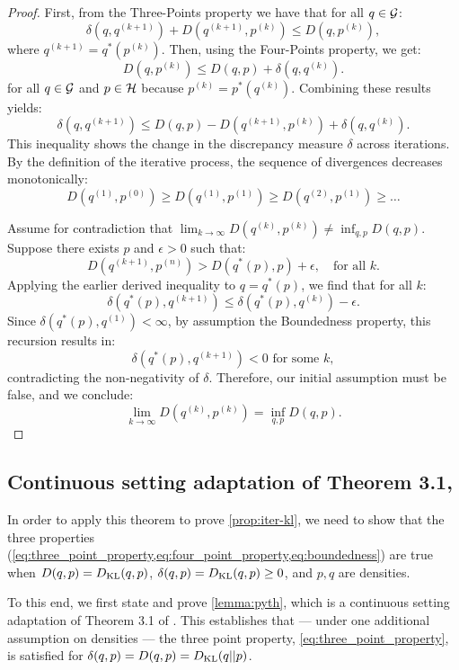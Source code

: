 \begin{proof}
First, from the Three-Points property we have that for all $q \in \mathcal{G}$:
\[
\delta(q, q^{(k+1)}) + D(q^{(k+1)}, p^{(k)}) \leq D(q, p^{(k)}),
\]
where $q^{(k+1)} = q^*(p^{(k)})$. Then, using the Four-Points property, we get:
\[
D(q, p^{(k)}) \leq D(q, p) + \delta(q, q^{(k)}).
\]
for all $q\in\mathcal{G}$ and $p\in\mathcal{H}$ because $p^{(k)} = p^{*}(q^{(k)})$. Combining these results yields:
\[
\delta(q, q^{(k+1)}) \leq D(q, p) - D(q^{(k+1)}, p^{(k)}) + \delta(q, q^{(k)}).
\]
This inequality shows the change in the discrepancy measure $\delta$ across iterations. By the definition of the iterative process, the sequence of divergences decreases monotonically:
\[
D(q^{(1)}, p^{(0)}) \geq D(q^{(1)}, p^{(1)}) \geq D(q^{(2)}, p^{(1)}) \geq \ldots
\]

Assume for contradiction that $\lim_{k \to \infty} D(q^{(k)}, p^{(k)}) \neq \inf_{q, p} D(q, p)$. Suppose there exists $p$ and $\epsilon > 0$ such that:
\[
D(q^{(k+1)}, p^{(n)}) > D(q^*(p), p) + \epsilon, \quad \text{for all } k.
\]
Applying the earlier derived inequality to $q = q^*(p)$, we find that for all $k$:
\[
\delta(q^*(p), q^{(k+1)}) \leq \delta(q^*(p), q^{(k)}) - \epsilon.
\]
Since $\delta(q^*(p), q^{(1)}) < \infty$, by assumption the Boundedness property, this recursion results in:
\[
\delta(q^*(p), q^{(k+1)}) < 0 \text{ for some } k,
\]
contradicting the non-negativity of $\delta$. Therefore, our initial assumption must be false, and we conclude:
\[
\lim_{k \to \infty} D(q^{(k)}, p^{(k)}) = \inf_{q, p} D(q, p).
\]
\end{proof}

\subsection{Continuous setting adaptation of Theorem 3.1, \texorpdfstring{\citet{csiszar2004information}}{}}

In order to apply this theorem to prove \cref{prop:iter-kl}, we need to show that the three properties (\cref{eq:three_point_property,eq:four_point_property,eq:boundedness}) are true when $D(q,p)=D_{\mathrm{KL}}(q,p)$, $\delta(q,p)=D_{\mathrm{KL}}(q,p)\ge 0$, and $p,q$ are densities.


To this end, we first state and prove \cref{lemma:pyth}, which is a continuous setting adaptation of Theorem 3.1 of \citet{csiszar2004information}. This establishes that  --- under one additional assumption on densities --- the three point property, \cref{eq:three_point_property}, is satisfied for $\delta(q,p)=D(q,p)=D_{\mathrm{KL}}(q||p)$.


